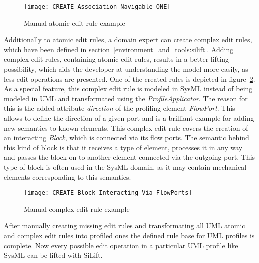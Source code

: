 \begin{figure}[h!]
\begin{center}
\texttt{[image: CREATE\_Association\_Navigable\_ONE]}\\
\end{center}
\caption{Manual atomic edit rule example}
\label{atomic_example}
\end{figure}

 Additionally to atomic edit rules, a domain expert can create complex edit
 rules, which have been defined in section~\ref{environment_and_tools:silift}.
 Adding complex edit rules, containing atomic edit rules, results in a better
 lifting possibility, which aids the developer at understanding the model more
 easily, as less edit operations are presented. One of the created rules is
 depicted in figure~\ref{complex_example}. As a special feature, this complex
 edit rule is modeled in \ac{SysML} instead of being modeled in \ac{UML} and
 transformated using the \textit{ProfileApplicator}. The reason for this is the
 added attribute \textit{direction} of the profiling element \textit{FlowPort}.
 This allows to define the direction of a given port and is a brilliant example for adding new
 semantics to known elements. This complex edit rule covers the creation of an
 interacting \textit{Block}, which is connected via its flow ports. The semantic
 behind this kind of block is that it receives a type of element, processes it in any
 way and passes the block on to another element connected via the outgoing port.
 This type of block is often used in the \ac{SysML} domain, as it may contain
 mechanical elements corresponding to this semantics.
 
 \begin{figure}[h!]
\begin{center}
\texttt{[image: CREATE\_Block\_Interacting\_Via\_FlowPorts]}\\
\end{center}
\caption{Manual complex edit rule example}
\label{complex_example}
\end{figure}

After manually creating missing edit rules and transformating all \ac{UML}
atomic and complex edit rules into profiled ones the defined rule base for \ac{UML}
profiles is complete. Now every possible edit operation in a particular
\ac{UML} profile like \ac{SysML} can be lifted with SiLift.
